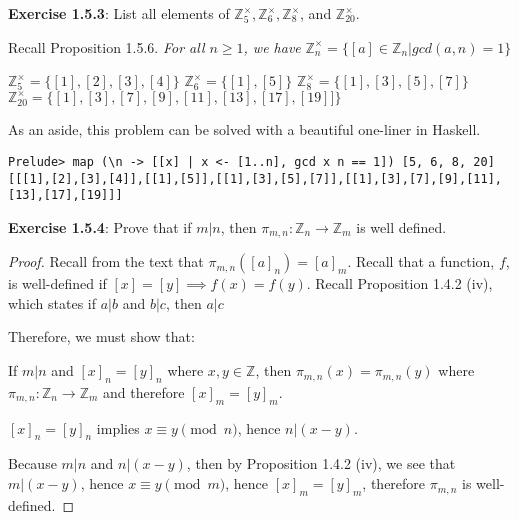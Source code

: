 \documentclass[a4paper]{article}
\begin{document}
\begin{myparindent}{0pt}
\textbf{Exercise 1.5.3}:
List all elements of $\mathbb{Z}_5^\times, \mathbb{Z}_6^\times, \mathbb{Z}_8^\times$, and $\mathbb{Z}_{20}^\times$.
\newline

Recall Proposition 1.5.6. \textit{For all $n \ge 1$, we have} $\mathbb{Z}_n^\times = \{ [a] \in \mathbb{Z}_n | gcd(a, n) = 1 \}$ \newline

$\mathbb{Z}_5^\times = \{  [1],[2],[3],[4] \}$ \newline
$\mathbb{Z}_6^\times = \{ [1],[5] \}$ \newline
$\mathbb{Z}_8^\times = \{ [1],[3],[5],[7] \}$ \newline
$\mathbb{Z}_{20}^\times = \{ [1],[3],[7],[9],[11],[13],[17],[19]] \}$ \newline

As an aside, this problem can be solved with a beautiful one-liner in Haskell. \
\begin{verbatim}
Prelude> map (\n -> [[x] | x <- [1..n], gcd x n == 1]) [5, 6, 8, 20]
[[[1],[2],[3],[4]],[[1],[5]],[[1],[3],[5],[7]],[[1],[3],[7],[9],[11],[13],[17],[19]]]
\end{verbatim}

\textbf{Exercise 1.5.4}:
Prove that if $m|n$, then $\pi_{m, n}: \mathbb{Z}_n \rightarrow \mathbb{Z}_m$ is well defined.

\begin{proof}

Recall from the text that $\pi_{m, n}([a]_n) = [a]_m$.
Recall that a function, $f$, is well-defined if $[x] = [y] \implies f(x) = f(y)$.
Recall Proposition 1.4.2 (iv), which states if $a|b$ and $b|c$, then $a|c$ \newline

Therefore, we must show that: \newline

If $m | n$ and $[x]_n = [y]_n$ where $x, y \in \mathbb{Z}$, then
$\pi_{m, n}(x) = \pi_{m, n}(y)$ where $\pi_{m, n}: \mathbb{Z}_n \rightarrow \mathbb{Z}_m$
and therefore $[x]_m = [y]_m$. \newline

$[x]_n = [y]_n$ implies $x \equiv y \pmod{n}$, hence $n | (x - y)$. \newline

Because $m | n$ and $n | (x - y)$, then by Proposition 1.4.2 (iv), we see that
$m | (x - y)$, hence $x \equiv y \pmod{m}$, hence $[x]_m = [y]_m$,
therefore $\pi_{m, n}$ is well-defined.

\end{proof}

\end{myparindent}
\end{document}
